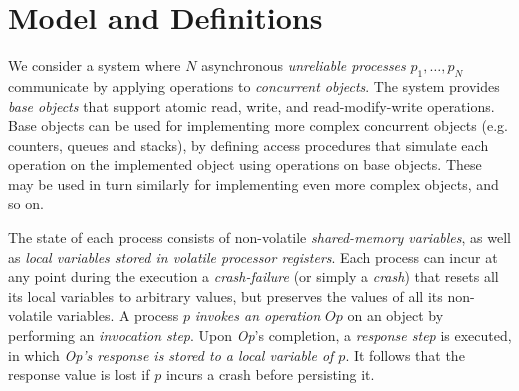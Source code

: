 
\section{Model and Definitions}
\label{section: Model}


We consider a system where $N$ asynchronous \textit{unreliable processes} $p_1, \ldots, p_{N}$ communicate by applying operations to \emph{concurrent objects}. The system provides \textit{base objects} that support atomic read, write, and read-modify-write operations.
Base objects can be used for implementing more complex concurrent objects (e.g. counters, queues and stacks), by defining access procedures that simulate each operation on the implemented object using operations on base objects. These may be used in turn similarly for implementing even more complex objects, and so on.

The state of each process consists of non-volatile \emph{shared-memory variables}, as well as \emph{local variables stored in volatile processor registers}. Each process can incur at any point during the execution a \emph{crash-failure} (or simply a \emph{crash}) that resets all its local variables to arbitrary values, but preserves the values of all its non-volatile variables. A process $p$ \emph{invokes an operation} $Op$ on an object by performing an \emph{invocation step}. Upon \emph{Op}'s completion, a \emph{response step} is executed, in which \emph{Op's response is stored to a local variable of $p$}. It follows that the response value is lost if $p$ incurs a crash before persisting it.

